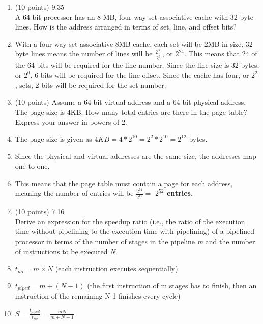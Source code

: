 \documentclass[letterpaper,10pt,onecolumn,titlepage]{article}
\begin{document}
\begin{enumerate}
\item (10 points) 9.35 \\
	A 64-bit processor has an 8-MB, four-way set-associative cache with 32-byte lines.
	How is the address arranged in terms of set, line, and offset bits?
\item[\textbullet] With a four way set associative 8MB cache, each set will be 2MB in
	size. 32 byte lines means the number of lines will be $\frac{2^{30}}{2^{6}}$, or
	$2^{24}$. This means that 24 of the 64 bits will be required for the line number.
	Since the line size is 32 bytes, or $2^{6}$, 6 bits will be required for the line
	offset. Since the cache has four, or $2^{2}$, sets, 2 bits will be required for
	the set number.

\item (10 points) Assume a 64-bit virtual address and a 64-bit physical address. The page
	size is 4KB. How many total entries are there in the page table? Express your
	answer in powers of 2.
\item[\textbullet] The page size is given as $4KB = 4*2^{10} = 2^{2}*2^{10} = 2^{12}$ 
	bytes.
\item[\textbullet] Since the physical and virtual addresses are the same size, the
	addresses map one to one.
\item[\textbullet] This means that the page table must contain a page for each address,
	meaning the number of entries will be $\frac{2^{64}}{2^{12}} =$ 
	\textbf{$2^{52}$ entries}.

\item (10 points) 7.16  \\
	Derive an expression for the speedup ratio (i.e., the ratio of the execution time
	without pipelining to the execution time with pipelining) of a pipelined processor
	in terms of the number of stages in the pipeline \textit{m} and the number of
	instructions to be executed \textit{N}.
\item[\textbullet] $t_{no} = m \times N$ (each instruction executes sequentially)
\item[\textbullet] $t_{piped} = m + (N - 1)$ (the first instruction of m stages has to 
	finish, then an instruction of the remaining N-1 finishes every cycle)
\item[\textbullet] $S = \frac{t_{piped}}{t_{no}} = \frac{mN}{m+N-1}$


\end{enumerate}
\end{document}
